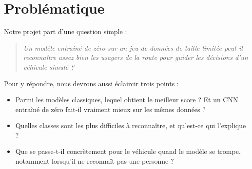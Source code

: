\section{Problématique}
\label{sec:problematique}

Notre projet part d'une question simple :

\begin{quote}
\itshape Un modèle entraîné de zéro sur un jeu de données de taille limitée peut-il reconnaître assez bien les usagers de la route pour guider les décisions d'un véhicule simulé ?
\end{quote}

Pour y répondre, nous devrons aussi éclaircir trois points :

\begin{itemize}
  \item Parmi les modèles classiques, lequel obtient le meilleur score ? Et un CNN entraîné de zéro fait-il vraiment mieux sur les mêmes données ?
  \item Quelles classes sont les plus difficiles à reconnaître, et qu'est-ce qui l'explique ?
  \item Que se passe-t-il concrètement pour le véhicule quand le modèle se trompe, notamment lorsqu'il ne reconnaît pas une personne ?
\end{itemize}
